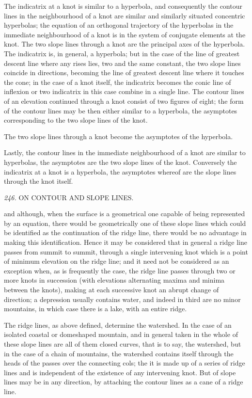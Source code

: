 \documentclass[11pt,a4paper]{book}
\begin{document}
The indicatrix at a knot is similar to a hyperbola, and consequently the contour lines in the neighbourhood of a knot are similar and similarly situated concentric hyperbolas; the equation of an orthogonal trajectory of the hyperbolas in the immediate neighbourhood of a knot is in the system of conjugate elements at the knot. The two slope lines through a knot are the principal axes of the hyperbola. The indicatrix is, in general, a hyperbola; but in the case of the line of greatest descent line where any rises lies, two and the same constant, the two slope lines coincide in directions, becoming the line of greatest descent line where it touches the cone; in the case of a knot itself, the indicatrix becomes the conic line of inflexion or two indicatrix in this case combine in a single line. The contour lines of an elevation continued through a knot consist of two figures of eight; the form of the contour lines may be then either similar to a hyperbola, the asymptotes corresponding to the two slope lines of the knot.

The two slope lines through a knot become the asymptotes of the hyperbola.

Lastly, the contour lines in the immediate neighbourhood of a knot are similar to hyperbolas, the asymptotes are the two slope lines of the knot. Conversely the indicatrix at a knot is a hyperbola, the asymptotes whereof are the slope lines through the knot itself.

\setcounter{page}{111}

\noindent\textit{246.} \quad ON CONTOUR AND SLOPE LINES.

and although, when the surface is a geometrical one capable of being represented by an equation, there would be geometrically one of these slope lines which could be identified as the continuation of the ridge line, there would be no advantage in making this identification. Hence it may be considered that in general a ridge line passes from summit to summit, through a single intervening knot which is a point of minimum elevation on the ridge line; and it need not be considered as an exception when, as is frequently the case, the ridge line passes through two or more knots in succession (with elevations alternating maxima and minima between the knots), making at each successive knot an abrupt change of direction; a depression usually contains water, and indeed in third are no minor mountains, in which case there is a lake, with an entire ridge.

The ridge lines, as above defined, determine the watershed. In the case of an isolated coastal or domeshaped mountain, and in general taken in the whole of these slope lines are all of them closed curves, that is to say, the watershed, but in the case of a chain of mountains, the watershed contains itself through the heads of the passes over the connecting cols; the it is made up of a series of ridge lines and is independent of the existence of any intervening knot. But of slope lines may be in any direction, by attaching the contour lines as a cane of a ridge line.
\end{document}
